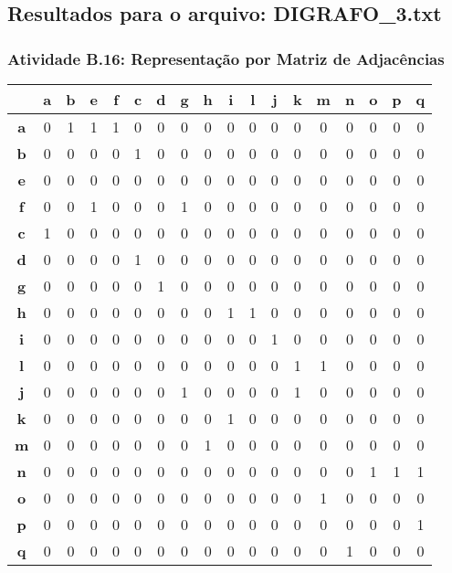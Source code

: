\documentclass[a4paper,12pt]{article}
\begin{document}
\subsection{Resultados para o arquivo: DIGRAFO\_3.txt}

\subsubsection*{Atividade B.16: Representação por Matriz de Adjacências}
\begin{center}
\tiny 
\begin{tabular*}{\textwidth}{c|@{\extracolsep{\fill}}ccccccccccccccccc}
\rowcolor[gray]{0.9}
 & \textbf{a} & \textbf{b} & \textbf{e} & \textbf{f} & \textbf{c} & \textbf{d} & \textbf{g} & \textbf{h} & \textbf{i} & \textbf{l} & \textbf{j} & \textbf{k} & \textbf{m} & \textbf{n} & \textbf{o} & \textbf{p} & \textbf{q} \\
\hline
\textbf{a} & 0 & 1 & 1 & 1 & 0 & 0 & 0 & 0 & 0 & 0 & 0 & 0 & 0 & 0 & 0 & 0 & 0 \\
\textbf{b} & 0 & 0 & 0 & 0 & 1 & 0 & 0 & 0 & 0 & 0 & 0 & 0 & 0 & 0 & 0 & 0 & 0 \\
\textbf{e} & 0 & 0 & 0 & 0 & 0 & 0 & 0 & 0 & 0 & 0 & 0 & 0 & 0 & 0 & 0 & 0 & 0 \\
\textbf{f} & 0 & 0 & 1 & 0 & 0 & 0 & 1 & 0 & 0 & 0 & 0 & 0 & 0 & 0 & 0 & 0 & 0 \\
\textbf{c} & 1 & 0 & 0 & 0 & 0 & 0 & 0 & 0 & 0 & 0 & 0 & 0 & 0 & 0 & 0 & 0 & 0 \\
\textbf{d} & 0 & 0 & 0 & 0 & 1 & 0 & 0 & 0 & 0 & 0 & 0 & 0 & 0 & 0 & 0 & 0 & 0 \\
\textbf{g} & 0 & 0 & 0 & 0 & 0 & 1 & 0 & 0 & 0 & 0 & 0 & 0 & 0 & 0 & 0 & 0 & 0 \\
\textbf{h} & 0 & 0 & 0 & 0 & 0 & 0 & 0 & 0 & 1 & 1 & 0 & 0 & 0 & 0 & 0 & 0 & 0 \\
\textbf{i} & 0 & 0 & 0 & 0 & 0 & 0 & 0 & 0 & 0 & 0 & 1 & 0 & 0 & 0 & 0 & 0 & 0 \\
\textbf{l} & 0 & 0 & 0 & 0 & 0 & 0 & 0 & 0 & 0 & 0 & 0 & 1 & 1 & 0 & 0 & 0 & 0 \\
\textbf{j} & 0 & 0 & 0 & 0 & 0 & 0 & 1 & 0 & 0 & 0 & 0 & 1 & 0 & 0 & 0 & 0 & 0 \\
\textbf{k} & 0 & 0 & 0 & 0 & 0 & 0 & 0 & 0 & 1 & 0 & 0 & 0 & 0 & 0 & 0 & 0 & 0 \\
\textbf{m} & 0 & 0 & 0 & 0 & 0 & 0 & 0 & 1 & 0 & 0 & 0 & 0 & 0 & 0 & 0 & 0 & 0 \\
\textbf{n} & 0 & 0 & 0 & 0 & 0 & 0 & 0 & 0 & 0 & 0 & 0 & 0 & 0 & 0 & 1 & 1 & 1 \\
\textbf{o} & 0 & 0 & 0 & 0 & 0 & 0 & 0 & 0 & 0 & 0 & 0 & 0 & 1 & 0 & 0 & 0 & 0 \\
\textbf{p} & 0 & 0 & 0 & 0 & 0 & 0 & 0 & 0 & 0 & 0 & 0 & 0 & 0 & 0 & 0 & 0 & 1 \\
\textbf{q} & 0 & 0 & 0 & 0 & 0 & 0 & 0 & 0 & 0 & 0 & 0 & 0 & 0 & 1 & 0 & 0 & 0 \\
\end{tabular*}
\end{center}
\end{document}

